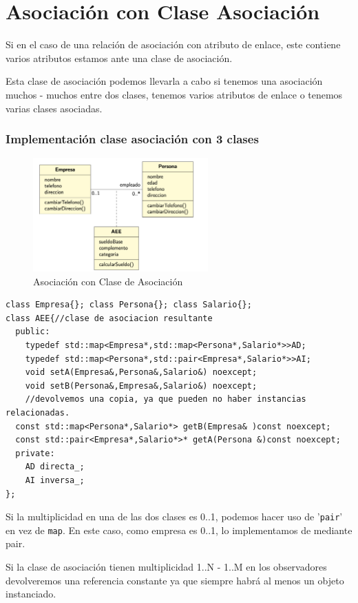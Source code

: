 \chapter{ Asociación con Clase Asociación}
Si en el caso de una relación de asociación con atributo de enlace, este contiene varios atributos 
estamos ante una clase de asociación.

Esta clase de asociación podemos llevarla a cabo si tenemos una asociación muchos - muchos 
entre dos clases, tenemos varios atributos de enlace o tenemos varias clases asociadas.
\subsection{Implementación clase asociación con 3 clases}
\begin{figure}[h]
    \centering
    \includegraphics[width=0.6\textwidth]{Imagenes/AClS.png}
    \caption{Asociación con Clase de Asociación}
\end{figure}
\begin{center}
	\begin{lstlisting}[frame=single]
class Empresa{}; class Persona{}; class Salario{};
class AEE{//clase de asociacion resultante
  public:
    typedef std::map<Empresa*,std::map<Persona*,Salario*>>AD;
    typedef std::map<Persona*,std::pair<Empresa*,Salario*>>AI;
    void setA(Empresa&,Persona&,Salario&) noexcept;
    void setB(Persona&,Empresa&,Salario&) noexcept;
    //devolvemos una copia, ya que pueden no haber instancias relacionadas.
  const std::map<Persona*,Salario*> getB(Empresa& )const noexcept;
  const std::pair<Empresa*,Salario*>* getA(Persona &)const noexcept;
  private:
    AD directa_; 
    AI inversa_;
};
\end{lstlisting}
\end{center}
Si la multiplicidad en una de las dos clases es 0..1, podemos hacer uso de '\texttt{pair}' 
en vez de \texttt{map}.
En este caso, como empresa es 0..1, lo implementamos de mediante pair.

Si la clase de asociación tienen multiplicidad 1..N - 1..M en los observadores devolveremos una referencia constante ya que siempre habrá al menos un objeto instanciado.

